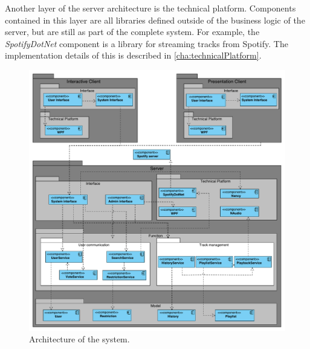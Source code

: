 Another layer of the server architecture is the
technical platform. Components contained in this layer are all
libraries defined outside of the business logic of the server, but are
still as part of the complete system. For example, the
\textit{SpotifyDotNet} component is a library for streaming tracks from
Spotify. The implementation details of this is described in
\cref{cha:technicalPlatform}.
\begin{figure}[H]
  \centering
  \includegraphics[width=1.2\linewidth]{Images/Arkitektur.pdf}
  \caption{Architecture of the system.}\label{fig:architecture}
\end{figure}
